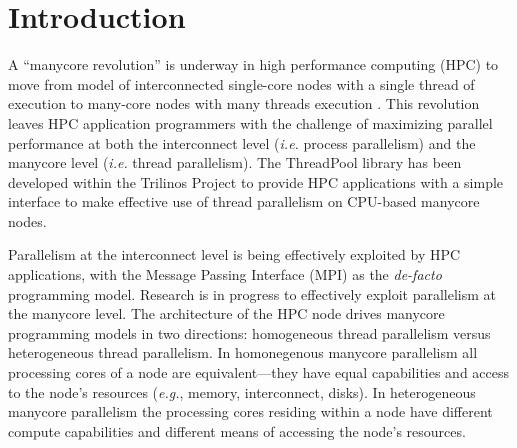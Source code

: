 \section{Introduction}

A ``manycore revolution'' is underway in high performance computing (HPC) to move from model of interconnected single-core nodes with a single thread of execution to many-core nodes with many threads execution 
\cite{SciDAC:ManycoreRevolution:WebSite}. 
%
This revolution leaves HPC application programmers with the challenge of maximizing parallel performance at both the interconnect level (\emph{i.e.} process parallelism) and the manycore level (\emph{i.e.} thread parallelism).
%
The ThreadPool library has been developed within the Trilinos Project 
\cite{Trilinos:WebSite} to provide HPC applications with a simple interface to make effective use of thread parallelism on CPU-based manycore nodes.


Parallelism at the interconnect level is being effectively exploited by HPC applications, with the Message Passing Interface (MPI) \cite{MPI:Standard:WebSite} as the \emph{de-facto} programming model.
%
Research is in progress to effectively exploit parallelism at the manycore level.
%
The architecture of the HPC node drives manycore programming models in two directions: homogeneous thread parallelism versus heterogeneous thread parallelism.
%
In homonegenous manycore parallelism all processing cores of a node are equivalent---they have equal capabilities and access to the node's resources 
(\emph{e.g.}, memory, interconnect, disks).
%
In heterogeneous manycore parallelism the processing cores residing within a node have different compute capabilities and different means of accessing the node's resources.


